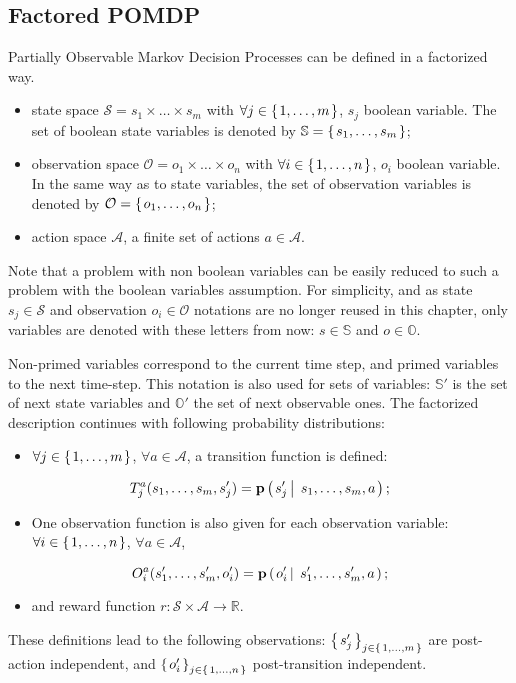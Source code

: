 \subsection{Factored POMDP}
Partially Observable Markov Decision Processes 
can be defined in a factorized way.
\begin{itemize}
\item state space $\mathcal{S} = s_1 \times \ldots \times s_m$ with 
$\forall j \in \left\{ \left.  1, \ldots, m \right. \right\}$, $s_j$ boolean variable. 
The set of boolean state variables is denoted by 
$\mathbb{S} = \left\{ \left.  s_1, \ldots, s_m  \right. \right\}$;
\item observation space $\mathcal{O} = o_1 \times \ldots \times o_n$ 
with $\forall i \in \left\{ \left.  1, \ldots, n \right. \right\}$, $o_i$ boolean variable.
In the same way as to state variables, the set of observation variables is denoted by 
$\mathcal{O}=\left\{ \left.  o_1, \ldots, o_n  \right. \right\}$;
\item action space $\mathcal{A}$, a finite set of actions $a \in \mathcal{A}$.
\end{itemize}
Note that a problem with non boolean variables can be easily reduced to such a problem
with the boolean variables assumption. 
For simplicity, and as state $s_j \in \mathcal{S}$ and observation $o_i \in \mathcal{O}$ notations are no longer reused 
in this chapter, only variables are denoted with these letters from now: $s \in \mathbb{S}$ and $o \in \mathbb{O}$.
 
Non-primed variables correspond to the
current time step, and primed variables to the next time-step.
This notation is also used for sets of variables: $\mathbb{S}'$ is the set
of next state variables and $\mathbb{O}'$ the set of next observable ones.
The factorized description continues with following probability distributions:
\begin{itemize}
\item $\forall j \in \left\{ \left. 1, \ldots, m \right. \right\}$, $\forall a \in \mathcal{A}$, a transition function is defined:
\end{itemize} 
\[ T_j^a(s_1, \ldots, s_m, s'_j) = \textbf{p} \left( \left.  s'_j \, \right| \left. \, s_1,\ldots,s_m, a \right. \right); \]
\begin{itemize}
\item One observation function is also given for each observation variable: $\forall i \in \left\{ \left. 1, \ldots, n \right. \right\}$, $\forall a \in \mathcal{A}$,
\end{itemize}
\[ O_i^a(s_1', \ldots, s_m', o'_i) = \textbf{p} \left( \left.  o'_i \, \right| \left. \, s_1',\ldots,s_m', a \right. \right); \]
\begin{itemize}
\item and reward function $r: \mathcal{S} \times \mathcal{A} \rightarrow \mathbb{R}$. 
\end{itemize}
These definitions lead to the following observations: $\left\{ \left.  s'_j  \right. \right\}_{j \in \left\{ \left. 1, \ldots, m \right. \right\}}$ 
are post-action independent, and $\left\{ \left.  o'_i  \right. \right\}_{j \in \left\{ \left. 1, \ldots, n \right. \right\}}$ post-transition independent. 
